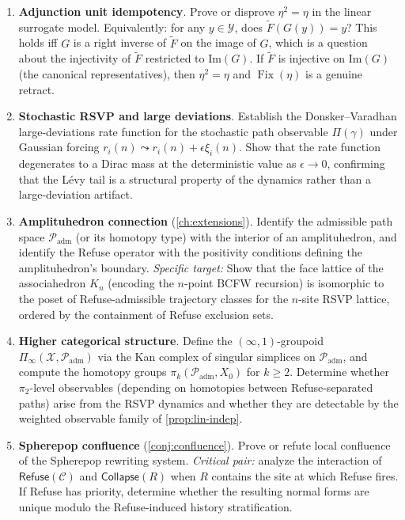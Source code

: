 \documentclass[12pt, oneside]{memoir}
\DeclareMathOperator{\Fix}{Fix}
\newcommand{\X}{\mathcal{X}}
\newcommand{\Ft}{\widetilde{F}}
\newcommand{\Padm}{\mathcal{P}_{\mathrm{adm}}}
\begin{document}
\begin{enumerate}
  \item \textbf{Adjunction unit idempotency}.  Prove or disprove $\eta^2 = \eta$ in the
        linear surrogate model.  Equivalently: for any $y \in \mathcal{Y}$, does
        $\Ft(G(y)) = y$?  This holds iff $G$ is a right inverse of $\Ft$ on the image
        of $G$, which is a question about the injectivity of $\Ft$ restricted to
        $\mathrm{Im}(G)$.  If $\Ft$ is injective on $\mathrm{Im}(G)$ (the canonical
        representatives), then $\eta^2 = \eta$ and $\Fix(\eta)$ is a genuine retract.

  \item \textbf{Stochastic RSVP and large deviations}.  Establish the
        Donsker--Varadhan large-deviations rate function for the stochastic path
        observable $\Pi(\gamma)$ under Gaussian forcing $r_i(n) \leadsto r_i(n) +
        \epsilon \xi_i(n)$.  Show that the rate function degenerates to a Dirac mass at
        the deterministic value as $\epsilon \to 0$, confirming that the Lévy tail is a
        structural property of the dynamics rather than a large-deviation artifact.

  \item \textbf{Amplituhedron connection} (\cref{ch:extensions}).  Identify the
        admissible path space $\Padm$ (or its homotopy type) with the interior of an
        amplituhedron, and identify the Refuse operator with the positivity conditions
        defining the amplituhedron's boundary.  \textit{Specific target:} Show that the
        face lattice of the associahedron $K_n$ (encoding the $n$-point BCFW recursion)
        is isomorphic to the poset of Refuse-admissible trajectory classes for the
        $n$-site RSVP lattice, ordered by the containment of Refuse exclusion sets.

  \item \textbf{Higher categorical structure}.  Define the $(\infty,1)$-groupoid
        $\Pi_\infty(\X, \Padm)$ via the Kan complex of singular simplices on $\Padm$,
        and compute the homotopy groups $\pi_k(\Padm, X_0)$ for $k \ge 2$.  Determine
        whether $\pi_2$-level observables (depending on homotopies between
        Refuse-separated paths) arise from the RSVP dynamics and whether they are
        detectable by the weighted observable family of \cref{prop:lin-indep}.

  \item \textbf{Spherepop confluence} (\cref{conj:confluence}).  Prove or refute local
        confluence of the Spherepop rewriting system.  \textit{Critical pair:} analyze
        the interaction of $\mathsf{Refuse}(\mathcal{C})$ and $\mathsf{Collapse}(R)$
        when $R$ contains the site at which Refuse fires.  If Refuse has priority,
        determine whether the resulting normal forms are unique modulo the Refuse-induced
        history stratification.


\end{enumerate}
\end{document}
